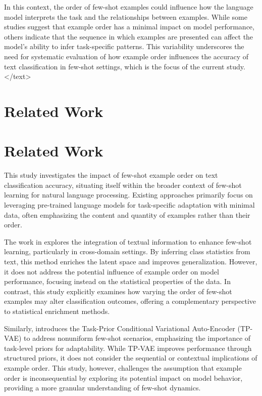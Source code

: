 \documentclass{article}
\begin{document}
In this context, the order of few-shot examples could influence how the language model interprets the task and the relationships between examples. While some studies suggest that example order has a minimal impact on model performance, others indicate that the sequence in which examples are presented can affect the model's ability to infer task-specific patterns. This variability underscores the need for systematic evaluation of how example order influences the accuracy of text classification in few-shot settings, which is the focus of the current study.
</text>
\section{Related Work}
\section{Related Work}

This study investigates the impact of few-shot example order on text classification accuracy, situating itself within the broader context of few-shot learning for natural language processing. Existing approaches primarily focus on leveraging pre-trained language models for task-specific adaptation with minimal data, often emphasizing the content and quantity of examples rather than their order. 

The work in \citet{2311.14544v1} explores the integration of textual information to enhance few-shot learning, particularly in cross-domain settings. By inferring class statistics from text, this method enriches the latent space and improves generalization. However, it does not address the potential influence of example order on model performance, focusing instead on the statistical properties of the data. In contrast, this study explicitly examines how varying the order of few-shot examples may alter classification outcomes, offering a complementary perspective to statistical enrichment methods.

Similarly, \citet{2205.15014v1} introduces the Task-Prior Conditional Variational Auto-Encoder (TP-VAE) to address nonuniform few-shot scenarios, emphasizing the importance of task-level priors for adaptability. While TP-VAE improves performance through structured priors, it does not consider the sequential or contextual implications of example order. This study, however, challenges the assumption that example order is inconsequential by exploring its potential impact on model behavior, providing a more granular understanding of few-shot dynamics.
\end{document}
